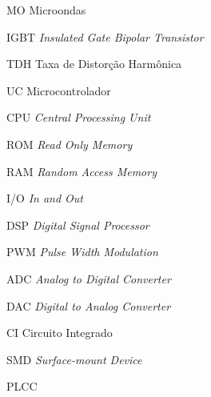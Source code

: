 
\begin{siglas}
    \item[MO] Microondas
    \item[IGBT] \textit{Insulated Gate Bipolar Transistor}
    \item[TDH] Taxa de Distorção Harmônica
    \item[UC] Microcontrolador
    \item[CPU] \textit{Central Processing Unit}
    \item[ROM] \textit{Read Only Memory}
    \item[RAM] \textit{Random Access Memory}
    \item[I/O] \textit{In and Out}
    \item[DSP] \textit{Digital Signal Processor}
    \item[PWM] \textit{Pulse Width Modulation}
    \item[ADC] \textit{Analog to Digital Converter}
    \item[DAC] \textit{Digital to Analog Converter}
    \item[CI] Circuito Integrado
    \item[SMD] \textit{Surface-mount Device}
    \item[PLCC] 
\end{siglas}

